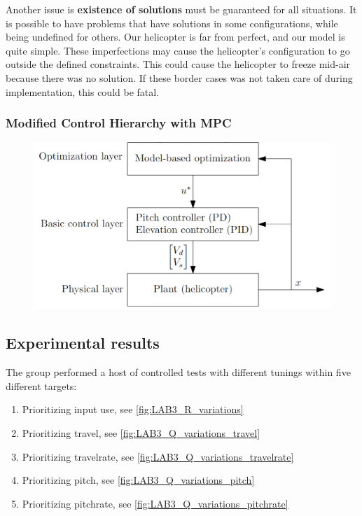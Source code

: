 \documentclass[../main.tex]{subfiles}
\begin{document}
Another issue is \textbf{existence of solutions} must be guaranteed for all situations. It is possible to have problems that have solutions in some configurations, while being undefined for others. Our helicopter is far from perfect, and our model is quite simple. These imperfections may cause the helicopter's configuration to go outside the defined constraints. This could cause the helicopter to freeze mid-air because there was no solution. If these border cases was not taken care of during implementation, this could be fatal.

\subsubsection{Modified Control Hierarchy with MPC}

\begin{figure}[h]
	\centering
	\includegraphics[width=0.7\linewidth]{content/MPC control hierarchy.png}
\end{figure}

\subsection{Experimental results}\label{sec:lab3_result}
The group performed a host of controlled tests with different tunings within five different targets:
\begin{enumerate}
	\item Prioritizing input use, see \cref{fig:LAB3_R_variations}
	\item Prioritizing travel, see \cref{fig:LAB3_Q_variations_travel}
	\item Prioritizing travelrate, see \cref{fig:LAB3_Q_variations_travelrate}
	\item Prioritizing pitch, see \cref{fig:LAB3_Q_variations_pitch}
	\item Prioritizing pitchrate, see \cref{fig:LAB3_Q_variations_pitchrate}
\end{enumerate}
\end{document}

